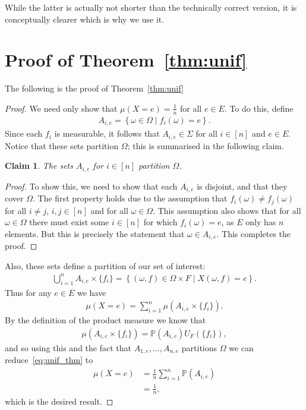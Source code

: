 \documentclass{article}
\newcommand{\set}[2]{\left\{ #1 \middle| #2 \right\}}
\newcommand{\seq}[1]{\left[#1\right]}
\newtheorem{claim}{Claim}
\theoremstyle{remark}
\renewcommand{\P}{\mathbb{P}}
\begin{document}
While the latter is actually not shorter than the technically correct version,
it is conceptually clearer which is why we use it.

\section{Proof of Theorem~\ref{thm:unif}}\label{app:unif}

The following is the proof of Theorem~\ref{thm:unif}

\begin{proof}
	We need only show that $\mu(X = e) = \frac{1}{n}$ for all $e \in E$. To do
	this, define
	\begin{align*}
		A_{i,e} = \set{\omega \in \Omega}{f_i(\omega) = e}.
	\end{align*}
	Since each $f_i$ is measurable, it follows that $A_{i,e} \in \Sigma$ for
	all $i \in \seq{n}$ and $e \in E$. Notice that these sets partition
	$\Omega$; this is summarised in the following claim.
	\begin{claim}
		The sets $A_{i,e}$ for $i \in \seq{n}$ partition $\Omega$.
	\end{claim}
	\begin{proof}
		To show this, we need to show that each $A_{i,e}$ is disjoint, and that
		they cover $\Omega$. The first property holds due to the assumption
		that $f_i(\omega) \ne f_j(\omega)$ for all $i \ne j$, $i, j \in
		\seq{n}$ and for all $\omega \in \Omega$. This assumption also shows
		that for all $\omega \in \Omega$ there must exist some $i \in \seq{n}$
		for which $f_i(\omega) = e$, as $E$ only has $n$ elements. But this is
		precisely the statement that $\omega \in A_{i,e}$. This completes the
		proof.
	\end{proof}
	Also, these sets define a partition of our set of interest:
	\begin{align*}
		\bigcup_{i=1}^n A_{i,e} \times \{f_i\}
		= \set{(\omega, f) \in \Omega \times F}{X(\omega, f) = e}.
	\end{align*}
	Thus for any $e \in E$ we have
	\begin{align}
		\label{eq:unif_thm}\mu(X = e) =
		\sum_{i=1}^n \mu\left(A_{i,e} \times \{f_i\}\right).
	\end{align}
	By the definition of the product measure we know that
	\begin{align*}
		\mu(A_{i,e} \times \{f_i\}) = \P(A_{i,e})U_F(\{f_i\}),
	\end{align*}
	and so using this and the fact that $A_{1,e}, \ldots, A_{n,e}$ partitions
	$\Omega$ we can reduce~\eqref{eq:unif_thm} to
	\begin{align*}
		\mu(X = e) &= \frac{1}{n}\sum_{i=1}^n \P(A_{i,e})\\
		&= \frac{1}{n},
	\end{align*}
	which is the desired result.
\end{proof}
\end{document}
